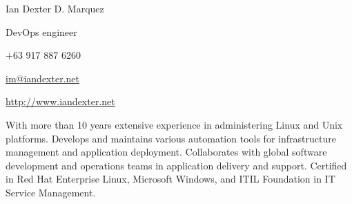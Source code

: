\documentclass[10pt, a4paper, final]{article}
\begin{document}
\begin{minipage}[c]{0.5\textwidth}
  \begin{flushleft}\begin{spacing}{1}
    \Huge Ian Dexter D. Marquez

    \Large DevOps engineer
  \end{spacing}\end{flushleft}
\end{minipage}
\begin{minipage}[c]{0.5\textwidth}
  \begin{flushright}\begin{spacing}{1}\small
    +63 917 887 6260 

    \href{mailto:im@iandexter.net}{im@iandexter.net} 

    \href{http://www.iandexter.net}{http://www.iandexter.net} 
  \end{spacing}\end{flushright}
\end{minipage}
\vspace{1em}
\hrulefill

With more than 10 years extensive experience in administering Linux and Unix platforms. Develops and maintains various automation tools for infrastructure management and application deployment. Collaborates with global software development and operations teams in application delivery and support. Certified in Red Hat Enterprise Linux, Microsoft Windows, and ITIL Foundation in IT Service Management.

\vspace{1.5em}
\end{document}
